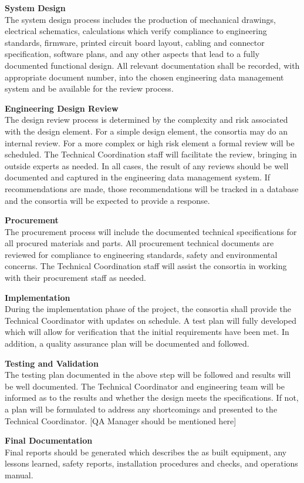 {\bf System Design}\\
The system design process includes the production of mechanical
drawings, electrical schematics, calculations which verify compliance
to engineering standards, firmware, printed circuit board layout,
cabling and connector specification, software plans, and any other
aspects that lead to a fully documented functional design.  All
relevant documentation shall be recorded, with appropriate document
number, into the chosen engineering data management system and be
available for the review process.

{\bf Engineering Design Review}\\
The design review process is determined by the complexity and risk
associated with the design element.  For a simple design element, the
consortia may do an internal review.  For a more complex or high risk
element a formal review will be scheduled.  The  Technical
Coordination staff will facilitate the review, bringing in outside
experts as needed.  In all cases, the result of any reviews should be
well documented and captured in the engineering data management
system.  If recommendations are made, those recommendations will be
tracked in a database and the consortia will be expected to provide a
response.

{\bf Procurement}\\ The procurement process will include the
documented technical specifications for all procured materials and
parts.  All procurement technical documents are reviewed for
compliance to engineering standards, safety and environmental
concerns.  The  Technical Coordination staff will assist the
consortia in working with their procurement staff as needed.

{\bf Implementation}\\ During the implementation phase of the project,
the consortia shall provide the Technical Coordinator with updates on
schedule.  A test plan will fully developed which will allow for
verification that the initial requirements have been met. In addition,
a quality assurance plan will be documented and followed.

{\bf Testing and Validation\\}
The testing plan documented in the above step will be followed and
results will be well documented.  The Technical Coordinator and
engineering team will be informed as to the results and whether the
design meets the specifications.  If not, a plan will be formulated
to address any shortcomings and presented to the Technical
Coordinator. [QA Manager should be mentioned here]

{\bf Final Documentation\\}
Final reports should be generated which describes the as built
equipment, any lessons learned, safety reports, installation procedures
and checks, and operations manual.
